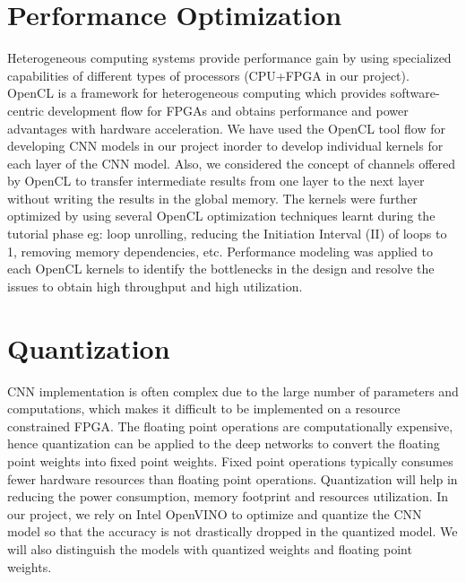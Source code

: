 \section{Performance Optimization}
Heterogeneous computing systems provide performance gain by using specialized capabilities of different types of processors (CPU+FPGA in our project). OpenCL is a framework for heterogeneous computing which provides software-centric development flow for FPGAs and obtains performance and power advantages with hardware acceleration. We have used the OpenCL tool flow for developing CNN models in our project inorder to develop individual kernels for each layer of the CNN model. Also, we considered the concept of channels offered by OpenCL to transfer intermediate results from one layer to the next layer without writing the results in the global memory. The kernels were further optimized by using several OpenCL optimization techniques learnt during the tutorial phase eg: loop unrolling, reducing the Initiation Interval (II) of loops to 1, removing memory dependencies, etc. Performance modeling was applied to each OpenCL kernels to identify the bottlenecks in the design and resolve the issues to obtain  high throughput and high utilization.

\section{Quantization }
CNN implementation is often complex due to the large number of parameters and computations, which makes it difficult to be implemented on a resource constrained FPGA. The floating point operations are computationally expensive, hence quantization can be applied to the deep networks to convert the floating point weights into fixed point weights. Fixed point operations typically consumes fewer hardware resources than floating point operations. Quantization will help in reducing the power consumption, memory footprint and resources utilization. In our project, we rely on Intel OpenVINO to optimize and quantize the CNN model so that the accuracy is not drastically dropped in the quantized model. We will also distinguish the models with quantized weights and floating point weights.
